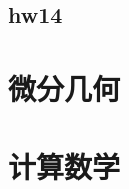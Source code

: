 \documentclass{mynote}
\begin{document}
\section{hw14}


\chapter{微分几何}







\chapter{计算数学}




% 
% 
% 
% 
% 
% 
% 
\end{document}

